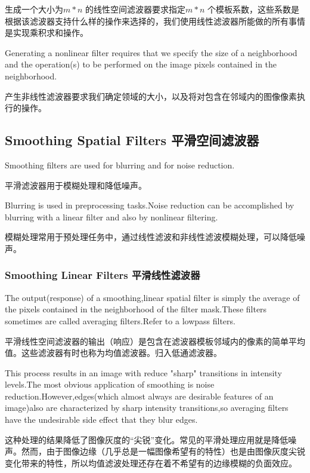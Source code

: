 \documentclass[12pt]{article}
\numberwithin{equation}{section}%
\begin{document}
生成一个大小为$m*n$ 的线性空间滤波器要求指定$m*n$ 个模板系数，这些系数是根据该滤波器支持什么样的操作来选择的，我们使用线性滤波器所能做的所有事情是实现乘积求和操作。

Generating a nonlinear filter requires that we specify the size of a neighborhood and the operation(s) to be performed on the image pixels contained in the neighborhood.

产生非线性滤波器要求我们确定领域的大小，以及将对包含在邻域内的图像像素执行的操作。

\subsection{Smoothing Spatial Filters 平滑空间滤波器}

Smoothing filters are used for blurring and for noise reduction. 

平滑滤波器用于模糊处理和降低噪声。

Blurring is used in preprocessing tasks.Noise reduction can be accomplished by blurring with a linear filter and also by nonlinear filtering.

模糊处理常用于预处理任务中，通过线性滤波和非线性滤波模糊处理，可以降低噪声。

\subsubsection{Smoothing Linear Filters 平滑线性滤波器}

The output(response) of a smoothing,linear spatial filter is simply the average of the pixels contained in the neighborhood of the filter mask.These filters sometimes are called averaging filters.Refer to a lowpass filters.

平滑线性空间滤波器的输出（响应）是包含在滤波器模板邻域内的像素的简单平均值。这些滤波器有时也称为均值滤波器。归入低通滤波器。

This process results in an image with reduce "sharp" transitions in intensity levels.The most obvious application of smoothing is noise reduction.However,edges(which almost always are desirable features of an image)also are characterized by sharp intensity transitions,so averaging filters have the undesirable side effect that they blur edges.

这种处理的结果降低了图像灰度的“尖锐”变化。常见的平滑处理应用就是降低噪声。然而，由于图像边缘（几乎总是一幅图像希望有的特性）也是由图像灰度尖锐变化带来的特性，所以均值滤波处理还存在着不希望有的边缘模糊的负面效应。
\end{document}
